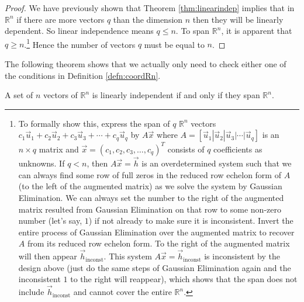 \begin{proof}
We have previously shown that Theorem \ref{thm:linearindep} implies that in $\mathbb{R}^n$ if there are more vectors $q$ than the dimension $n$ then they will be linearly dependent. So linear independence means $q \leq n$. To span $\mathbb{R}^n$, it is apparent that $q \geq n$.\footnote{
\label{foot:inconsth}
To formally show this, express the span of $q$ $\mathbb{R}^n$ vectors $c_1\vec{u}_1 + c_2\vec{u}_2 + c_3\vec{u}_3 + \cdots + c_q\vec{u}_q$ by $A\vec{x}$ where $A = [\vec{u}_1|\vec{u}_2|\vec{u}_3|\cdots|\vec{u}_q]$ is an $n \times q$ matrix and $\vec{x} = (c_1, c_2, c_3, \ldots, c_q)^T$ consists of $q$ coefficients as unknowns. If $q < n$, then $A\vec{x} = \vec{h}$ is an overdetermined system such that we can always find some row of full zeros in the reduced row echelon form of $A$ (to the left of the augmented matrix) as we solve the system by Gaussian Elimination. We can always set the number to the right of the augmented matrix resulted from Gaussian Elimination on that row to some non-zero number (let's say, $1$) if not already to make sure it is inconsistent. Invert the entire process of Gaussian Elimination over the augmented matrix to recover $A$ from its reduced row echelon form. To the right of the augmented matrix will then appear $\vec{h}_{\text{inconst}}$. This system $A\vec{x} = \vec{h}_{\text{inconst}}$ is inconsistent by the design above (just do the same steps of Gaussian Elimination again and the inconsistent $1$ to the right will reappear), which shows that the span does not include $\vec{h}_{\text{inconst}}$ and cannot cover the entire $\mathbb{R}^n$.} Hence the number of vectors $q$ must be equal to $n$.
\end{proof}
The following theorem shows that we actually only need to check either one of the conditions in Definition \ref{defn:coordRn}.
\begin{thm}
\label{thm:linindspan}
A set of $n$ vectors of $\mathbb{R}^n$ is linearly independent if and only if they span $\mathbb{R}^n$.
\end{thm}
